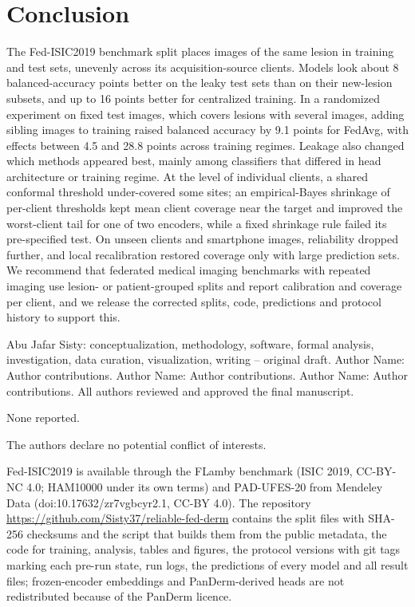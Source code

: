 \documentclass[VANCOUVER,Times1COL]{WileyNJDv5}
\begin{document}
\section{Conclusion}
\label{sec:conclusion}

The Fed-ISIC2019 benchmark split places images of the same lesion in training and test sets, unevenly
across its acquisition-source clients. Models look about 8 balanced-accuracy points better on the leaky
test sets than on their new-lesion subsets, and up to 16 points better for centralized training.
In a randomized experiment on fixed test images, which covers lesions with several images, adding sibling
images to training raised balanced accuracy by 9.1 points for FedAvg, with effects between 4.5 and 28.8
points across training regimes. Leakage also changed which methods appeared best, mainly among classifiers
that differed in head architecture or training regime. At the level of individual clients, a shared conformal threshold under-covered some
sites; an empirical-Bayes shrinkage of per-client thresholds kept mean client coverage near the target and
improved the worst-client tail for one of two encoders, while a fixed shrinkage rule failed its
pre-specified test. On unseen clients and smartphone images, reliability dropped further, and local
recalibration restored coverage only with large prediction sets. We recommend that federated medical
imaging benchmarks with repeated imaging use lesion- or patient-grouped splits and report calibration and
coverage per client, and we release the corrected splits, code, predictions and protocol history to
support this.

Abu Jafar Sisty: conceptualization, methodology, software, formal analysis, investigation, data
curation, visualization, writing -- original draft. Author Name: Author contributions. Author Name:
Author contributions. Author Name: Author contributions. All authors reviewed and approved the final
manuscript. %


None reported. %

The authors declare no potential conflict of interests.

Fed-ISIC2019 is available through the FLamby benchmark (ISIC 2019, CC-BY-NC 4.0; HAM10000 under its own
terms) and PAD-UFES-20 from Mendeley Data (doi:10.17632/zr7vgbcyr2.1, CC-BY 4.0). The repository
\url{https://github.com/Sisty37/reliable-fed-derm} contains the split files with SHA-256 checksums and the
script that builds them from the public metadata, the code for training, analysis, tables and figures,
the protocol versions with git tags marking each pre-run state, run logs, the predictions of every model and
all result files; frozen-encoder embeddings and PanDerm-derived heads are not redistributed because of the
PanDerm licence. %
\end{document}
